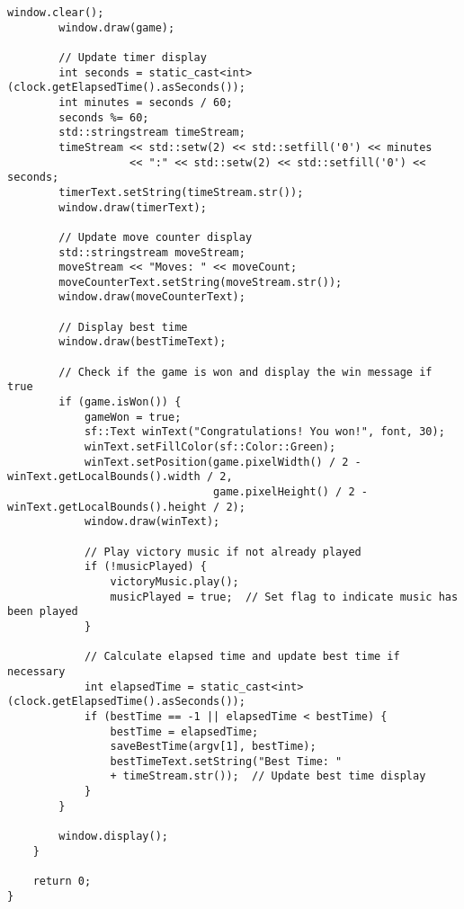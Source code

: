 \documentclass[12pt]{article}
\begin{document}
\begin{lstlisting}[style=cppcode]
        window.clear();
        window.draw(game);

        // Update timer display
        int seconds = static_cast<int>(clock.getElapsedTime().asSeconds());
        int minutes = seconds / 60;
        seconds %= 60;
        std::stringstream timeStream;
        timeStream << std::setw(2) << std::setfill('0') << minutes
                   << ":" << std::setw(2) << std::setfill('0') << seconds;
        timerText.setString(timeStream.str());
        window.draw(timerText);

        // Update move counter display
        std::stringstream moveStream;
        moveStream << "Moves: " << moveCount;
        moveCounterText.setString(moveStream.str());
        window.draw(moveCounterText);

        // Display best time
        window.draw(bestTimeText);

        // Check if the game is won and display the win message if true
        if (game.isWon()) {
            gameWon = true;
            sf::Text winText("Congratulations! You won!", font, 30);
            winText.setFillColor(sf::Color::Green);
            winText.setPosition(game.pixelWidth() / 2 - winText.getLocalBounds().width / 2,
                                game.pixelHeight() / 2 - winText.getLocalBounds().height / 2);
            window.draw(winText);

            // Play victory music if not already played
            if (!musicPlayed) {
                victoryMusic.play();
                musicPlayed = true;  // Set flag to indicate music has been played
            }

            // Calculate elapsed time and update best time if necessary
            int elapsedTime = static_cast<int>(clock.getElapsedTime().asSeconds());
            if (bestTime == -1 || elapsedTime < bestTime) {
                bestTime = elapsedTime;
                saveBestTime(argv[1], bestTime);
                bestTimeText.setString("Best Time: "
                + timeStream.str());  // Update best time display
            }
        }

        window.display();
    }

    return 0;
}
\end{lstlisting}
\end{document}
